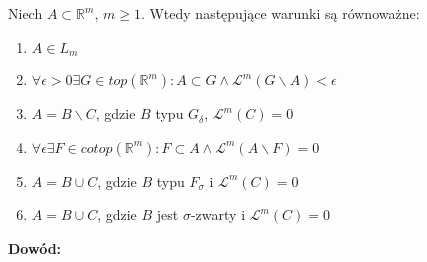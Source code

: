 \begin{tw}
	Niech $A \subset \mathbb{R}^m$, $m \geq 1$. Wtedy następujące warunki są równoważne:
	\begin{enumerate}
		\item $A \in L_m$
		\item $\forall \epsilon > 0 \exists G \in top(\mathbb{R}^m): A \subset G \wedge \mathcal{L}^m(G \backslash A) < \epsilon$
		\item $A = B \backslash C$, gdzie $B$ typu $G_{\delta}$, $\mathcal{L}^m(C) = 0$ 
		\item $\forall \epsilon \exists F \in cotop(\mathbb{R}^m): F \subset A \wedge \mathcal{L}^m(A \backslash F) = 0$  
		\item $A = B \cup C$, gdzie $B$ typu $F_{\sigma}$ i  $\mathcal{L}^m(C) = 0$ 
		\item $A = B \cup C$, gdzie $B$ jest $\sigma$-zwarty i $\mathcal{L}^m(C) = 0$ 
	\end{enumerate}

	\textbf{Dowód:} \citep[3.42]{Tworzewski}
\end{tw}